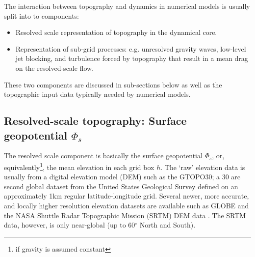 \documentclass[gmd]{copernicus}
\begin{document}
The interaction between topography and dynamics in numerical models is usually split into to components:
\begin{itemize}
\item Resolved scale representation of topography in the dynamical core.
\item Representation of sub-grid processes: e.g. unresolved gravity waves, low-level jet blocking, and turbulence forced by topography that result in a mean drag on the resolved-scale flow.
\end{itemize}
These two components are discussed in sub-sections below as well as the topographic input data typically needed by numerical models.
\subsection{Resolved-scale topography: Surface geopotential $\Phi_s$}
The resolved scale component is basically the surface geopotential $\Phi_s$, or, equivalently{\footnote{if gravity is assumed constant}}, the mean elevation in each grid box $h$. The `raw' elevation data is usually from a digital elevation model (DEM) such as the GTOPO30; a 30 arc second global dataset from the United States Geological Survey \citep[USGS; ][]{USGS} defined on an approximately 1km regular latitude-longitude grid. Several newer, more accurate, and locally higher resolution elevation datasets are available such as GLOBE \citep{GLOBE} and the NASA Shuttle Radar Topographic Mission (SRTM) DEM data \citep{SRTM}. The SRTM data, however, is only near-global (up to 60$^\circ$ North and South).
\end{document}
